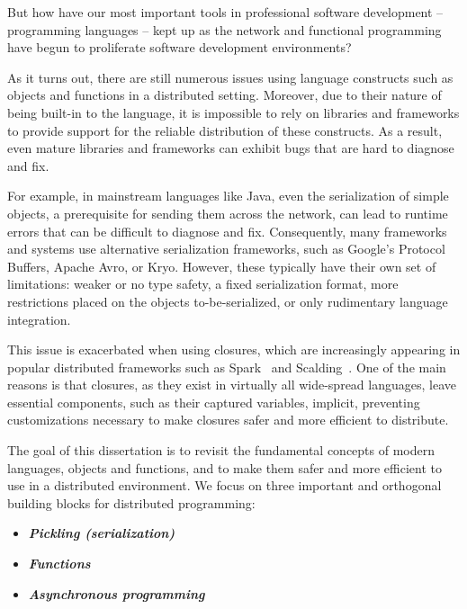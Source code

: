 
But how have our most important tools in professional software development --
programming languages -- kept up as the network and functional programming have
begun to proliferate software development environments?

As it turns out, there are still numerous issues using language constructs such
as objects and functions in a distributed setting. Moreover, due to their nature
of being built-in to the language, it is impossible to rely on libraries and
frameworks to provide support for the reliable distribution of these constructs.
As a result, even mature libraries and frameworks can exhibit bugs that are hard
to diagnose and fix.

For example, in mainstream languages like Java, even the serialization of simple
objects, a prerequisite for sending them across the network, can lead to runtime
errors that can be difficult to diagnose and fix. Consequently, many frameworks and systems use alternative serialization frameworks, such as Google's Protocol Buffers, Apache Avro, or Kryo. However, these typically have their own set of limitations: weaker or no type safety, a fixed serialization format, more restrictions placed on the objects to-be-serialized, or only rudimentary language integration.

This issue is exacerbated when using closures, which are increasingly appearing
in popular distributed frameworks such as Spark~\cite{Spark} and
Scalding~\cite{Scalding}. One of the main reasons is that closures, as they
exist in virtually all wide-spread languages, leave essential components, such
as their captured variables, implicit, preventing customizations necessary to
make closures safer and more efficient to distribute.

The goal of this dissertation is to revisit the fundamental concepts of modern
languages, objects and functions, and to make them safer and more efficient to
use in a distributed environment. We focus on three important and orthogonal
building blocks for distributed programming:

\begin{itemize}
  \item {\bf \em Pickling (serialization)}
  \item {\bf \em Functions}
  \item {\bf \em Asynchronous programming}
\end{itemize}

